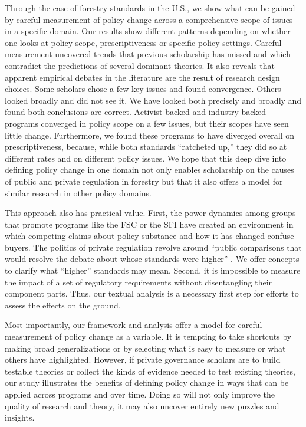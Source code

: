 \documentclass[
      12pt,
            Review ]{article}
\begin{document}
Through the case of forestry standards in the U.S., we show what can be
gained by careful measurement of policy change across a comprehensive
scope of issues in a specific domain. Our results show different
patterns depending on whether one looks at policy scope,
prescriptiveness or specific policy settings. Careful measurement
uncovered trends that previous scholarship has missed and which
contradict the predictions of several dominant theories. It also reveals
that apparent empirical debates in the literature are the result of
research design choices. Some scholars chose a few key issues and found
convergence. Others looked broadly and did not see it. We have looked
both precisely and broadly and found both conclusions are correct.
Activist-backed and industry-backed programs converged in policy scope
on a few issues, but their scopes have seen little change. Furthermore,
we found these programs to have diverged overall on prescriptiveness,
because, while both standards ``ratcheted up,'' they did so at different
rates and on different policy issues. We hope that this deep dive into
defining policy change in one domain not only enables scholarship on the
causes of public and private regulation in forestry but that it also
offers a model for similar research in other policy domains.

This approach also has practical value. First, the power dynamics among
groups that promote programs like the FSC or the SFI have created an
environment in which competing claims about policy substance and how it
has changed confuse buyers. The politics of private regulation revolve
around ``public comparisons that would resolve the debate about whose
standards were higher'' \citep{Overdevest2010}. We offer concepts to
clarify what ``higher'' standards may mean. Second, it is impossible to
measure the impact of a set of regulatory requirements without
disentangling their component parts. Thus, our textual analysis is a
necessary first step for efforts to assess the effects on the ground.

Most importantly, our framework and analysis offer a model for careful
measurement of policy change as a variable. It is tempting to take
shortcuts by making broad generalizations or by selecting what is easy
to measure or what others have highlighted. However, if private
governance scholars are to build testable theories or collect the kinds
of evidence needed to test existing theories, our study illustrates the
benefits of defining policy change in ways that can be applied across
programs and over time. Doing so will not only improve the quality of
research and theory, it may also uncover entirely new puzzles and
insights.
  \newpage 
  \theendnotes
\newpage
\singlespacing 
           
  
\end{document}
